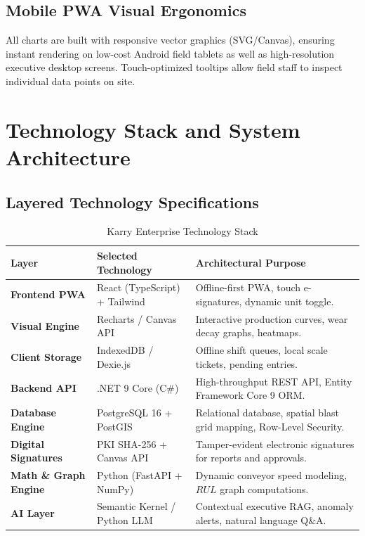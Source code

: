 \documentclass[11pt, a4paper]{article}
\begin{document}
\subsection{Mobile PWA Visual Ergonomics}
All charts are built with responsive vector graphics (SVG/Canvas), ensuring instant rendering on low-cost Android field tablets as well as high-resolution executive desktop screens. Touch-optimized tooltips allow field staff to inspect individual data points on site.

\section{Technology Stack and System Architecture}

\subsection{Layered Technology Specifications}

\begin{table}[htbp]
\centering
\caption{Karry Enterprise Technology Stack}
\vspace{0.2cm}
\begin{tabular}{lll}
\toprule
\textbf{Layer} & \textbf{Selected Technology} & \textbf{Architectural Purpose} \\
\midrule
\textbf{Frontend PWA} & React (TypeScript) + Tailwind & Offline-first PWA, touch e-signatures, dynamic unit toggle. \\
\textbf{Visual Engine} & Recharts / Canvas API & Interactive production curves, wear decay graphs, heatmaps. \\
\textbf{Client Storage} & IndexedDB / Dexie.js & Offline shift queues, local scale tickets, pending entries. \\
\textbf{Backend API} & .NET 9 Core (C\#) & High-throughput REST API, Entity Framework Core 9 ORM. \\
\textbf{Database Engine} & PostgreSQL 16 + PostGIS & Relational database, spatial blast grid mapping, Row-Level Security. \\
\textbf{Digital Signatures} & PKI SHA-256 + Canvas API & Tamper-evident electronic signatures for reports and approvals. \\
\textbf{Math \& Graph Engine} & Python (FastAPI + NumPy) & Dynamic conveyor speed modeling, $RUL$ graph computations. \\
\textbf{AI Layer} & Semantic Kernel / Python LLM & Contextual executive RAG, anomaly alerts, natural language Q\&A. \\
\bottomrule
\end{tabular}
\end{table}
\end{document}
